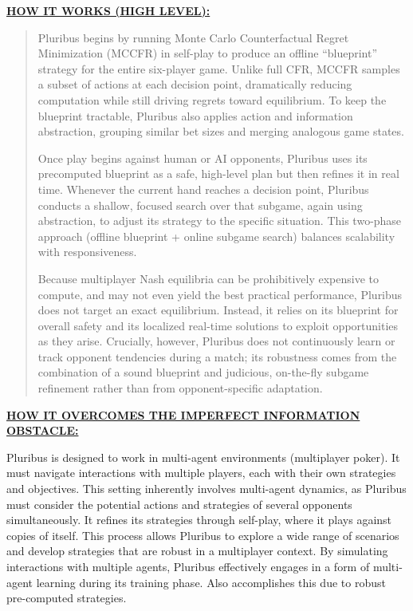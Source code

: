 \documentclass[
]{article}
\begin{document}
\textbf{\ul{HOW IT WORKS (HIGH LEVEL):}}

\begin{quote}
Pluribus begins by running Monte Carlo Counterfactual Regret
Minimization (MCCFR) in self-play to produce an offline ``blueprint''
strategy for the entire six-player game. Unlike full CFR, MCCFR samples
a subset of actions at each decision point, dramatically reducing
computation while still driving regrets toward equilibrium. To keep the
blueprint tractable, Pluribus also applies action and information
abstraction, grouping similar bet sizes and merging analogous game
states.

Once play begins against human or AI opponents, Pluribus uses its
precomputed blueprint as a safe, high-level plan but then refines it in
real time. Whenever the current hand reaches a decision point, Pluribus
conducts a shallow, focused search over that subgame, again using
abstraction, to adjust its strategy to the specific situation. This
two-phase approach (offline blueprint + online subgame search) balances
scalability with responsiveness.

Because multiplayer Nash equilibria can be prohibitively expensive to
compute, and may not even yield the best practical performance, Pluribus
does not target an exact equilibrium. Instead, it relies on its
blueprint for overall safety and its localized real-time solutions to
exploit opportunities as they arise. Crucially, however, Pluribus does
not continuously learn or track opponent tendencies during a match; its
robustness comes from the combination of a sound blueprint and
judicious, on-the-fly subgame refinement rather than from
opponent-specific adaptation.
\end{quote}

\textbf{\ul{HOW IT OVERCOMES THE IMPERFECT INFORMATION OBSTACLE:}}

Pluribus is designed to work in multi-agent environments (multiplayer
poker). It must navigate interactions with multiple players, each with
their own strategies and objectives. This setting inherently involves
multi-agent dynamics, as Pluribus must consider the potential actions
and strategies of several opponents simultaneously. It refines its
strategies through self-play, where it plays against copies of itself.
This process allows Pluribus to explore a wide range of scenarios and
develop strategies that are robust in a multiplayer context. By
simulating interactions with multiple agents, Pluribus effectively
engages in a form of multi-agent learning during its training phase.
Also accomplishes this due to robust pre-computed strategies.
\end{document}
